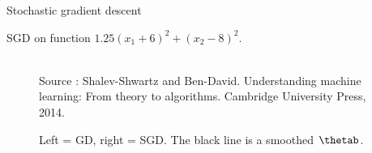 \begin{vbframe}{Stochastic gradient descent}
  \framebreak

 
 SGD on function $1.25(x_1 + 6)^2 + (x_2 - 8)^2$.
 \begin{figure}
    \tiny{\\ Source : Shalev-Shwartz and  Ben-David.
Understanding machine learning: From theory to algorithms. Cambridge University Press, 2014. }
 \caption{Left = GD, right = SGD. The black line is a smoothed $\thetab$.}
 \end{figure}

  \end{vbframe}
  


